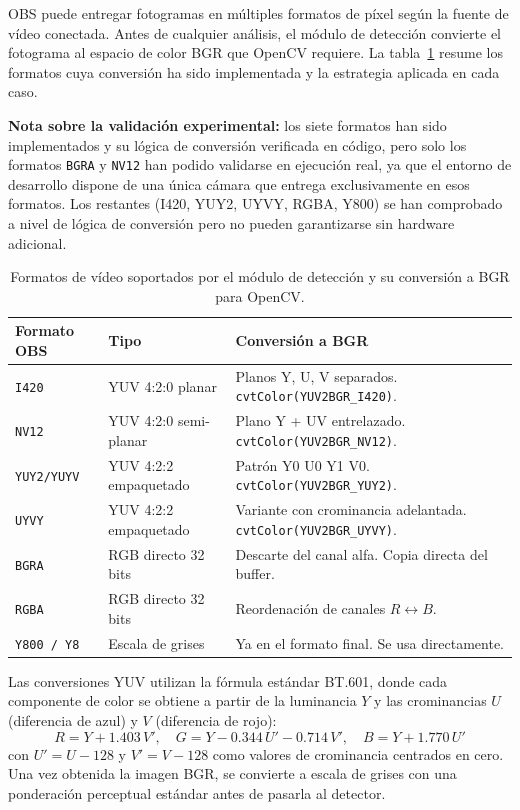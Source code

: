 OBS puede entregar fotogramas en múltiples formatos de píxel según la fuente de vídeo conectada.
Antes de cualquier análisis, el módulo de detección convierte el fotograma al espacio de color BGR
que OpenCV requiere. La tabla~\ref{tab:formatos_video} resume los formatos cuya conversión ha sido implementada y la estrategia aplicada en cada caso.

\textbf{Nota sobre la validación experimental:} los siete formatos han sido implementados y su lógica de conversión verificada en código, pero solo los formatos \texttt{BGRA} y \texttt{NV12} han podido validarse en ejecución real, ya que el entorno de desarrollo dispone de una única cámara que entrega exclusivamente en esos formatos. Los restantes (I420, YUY2, UYVY, RGBA, Y800) se han comprobado a nivel de lógica de conversión pero no pueden garantizarse sin hardware adicional.

\begin{table}[H]
\centering
\renewcommand{\arraystretch}{1.2}
\begin{tabular}{|l|l|p{5.5cm}|}
\hline
\textbf{Formato OBS} & \textbf{Tipo} & \textbf{Conversión a BGR} \\
\hline
\texttt{I420}      & YUV 4:2:0 planar      & Planos Y, U, V separados. \texttt{cvtColor(YUV2BGR\_I420)}. \\
\texttt{NV12}      & YUV 4:2:0 semi-planar & Plano Y + UV entrelazado. \texttt{cvtColor(YUV2BGR\_NV12)}. \\
\texttt{YUY2/YUYV} & YUV 4:2:2 empaquetado & Patrón Y0 U0 Y1 V0. \texttt{cvtColor(YUV2BGR\_YUY2)}. \\
\texttt{UYVY}      & YUV 4:2:2 empaquetado & Variante con crominancia adelantada. \texttt{cvtColor(YUV2BGR\_UYVY)}. \\
\texttt{BGRA}      & RGB directo 32 bits   & Descarte del canal alfa. Copia directa del buffer. \\
\texttt{RGBA}      & RGB directo 32 bits   & Reordenación de canales $R \leftrightarrow B$. \\
\texttt{Y800 / Y8} & Escala de grises      & Ya en el formato final. Se usa directamente. \\
\hline
\end{tabular}
\caption{Formatos de vídeo soportados por el módulo de detección y su conversión a BGR para OpenCV.}
\label{tab:formatos_video}
\end{table}

Las conversiones YUV utilizan la fórmula estándar BT.601, donde cada componente de color se
obtiene a partir de la luminancia $Y$ y las crominancias $U$ (diferencia de azul) y $V$
(diferencia de rojo):
\[
  R = Y + 1.403\,V', \quad G = Y - 0.344\,U' - 0.714\,V', \quad B = Y + 1.770\,U'
\]
con $U' = U - 128$ y $V' = V - 128$ como valores de crominancia centrados en cero. Una vez
obtenida la imagen BGR, se convierte a escala de grises con una ponderación perceptual estándar
antes de pasarla al detector.


